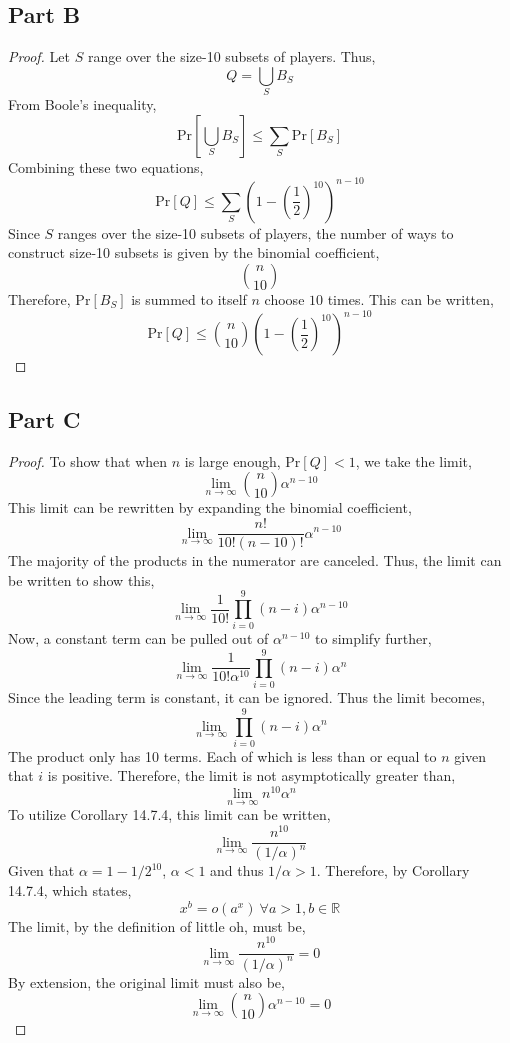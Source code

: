 \documentclass{article}
\begin{document}
\break

\subsection*{Part B}

\begin{proof}

  Let $S$ range over the size-10 subsets of players. Thus,
  $$ Q = \bigcup_{S} B_S $$
  From Boole's inequality,
  $$ \mathrm{Pr}\left[ \bigcup_{S} B_S \right] \leq \sum_{S}
  \mathrm{Pr}\left[B_S\right] $$
  Combining these two equations,
  $$ \mathrm{Pr}[Q] \leq \sum_S \left(1 - \left( \frac{1}{2} \right)^{10}
  \right)^{n - 10} $$
  Since $S$ ranges over the size-10 subsets of players, the number of ways to
  construct size-10 subsets is given by the binomial coefficient,
  $$ \binom{n}{10} $$
  Therefore, $\mathrm{Pr}[B_S]$ is summed to itself $n$ choose $10$ times. This
  can be written,
  $$ \mathrm{Pr}[Q] \leq \binom{n}{10} \left(1 - \left( \frac{1}{2} \right)^{10}
  \right)^{n - 10} $$

\end{proof}

\break

\subsection*{Part C}

\begin{proof}

  To show that when $n$ is large enough, $\mathrm{Pr}[Q] < 1$, we take the
  limit,
  $$ \lim_{n \to \infty} \binom{n}{10} \alpha^{n - 10} $$
  This limit can be rewritten by expanding the binomial coefficient,
  $$ \lim_{n \to \infty} \frac{n!}{10! (n - 10)!} \alpha^{n - 10} $$
  The majority of the products in the numerator are canceled. Thus, the limit
  can be written to show this,
  $$ \lim_{n \to \infty} \frac{1}{10!} \prod_{i = 0}^9 (n - i) \alpha^{n - 10}
  $$
  Now, a constant term can be pulled out of $\alpha^{n-10}$ to simplify further,
  $$ \lim_{n \to \infty} \frac{1}{10! \alpha^{10}} \prod_{i = 0}^9 (n - i)
  \alpha^{n} $$
  Since the leading term is constant, it can be ignored. Thus the limit becomes,
  $$ \lim_{n \to \infty} \prod_{i = 0}^9 (n - i) \alpha^{n} $$
  The product only has 10 terms. Each of which is less than or equal to $n$
  given that $i$ is positive. Therefore, the limit is not asymptotically greater
  than,
  $$  \lim_{n \to \infty} n^{10} \alpha^{n} $$
  To utilize Corollary 14.7.4, this limit can be written,
  $$ \lim_{n \to \infty} \frac{n^{10}}{\left(1/\alpha\right)^n} $$
  Given that $\alpha = 1 - 1/2^{10}$, $\alpha < 1$ and thus $1 / \alpha > 1$.
  Therefore, by Corollary 14.7.4, which states,
  $$ x^b = o(a^x)\ \forall a > 1, b \in \mathbb{R} $$
  The limit, by the definition of little oh, must be,
  $$ \lim_{n \to \infty} \frac{n^{10}}{\left(1/\alpha\right)^n} = 0 $$
  By extension, the original limit must also be,
  $$  \lim_{n \to \infty} \binom{n}{10} \alpha^{n - 10} = 0 $$


\end{proof}
\end{document}
